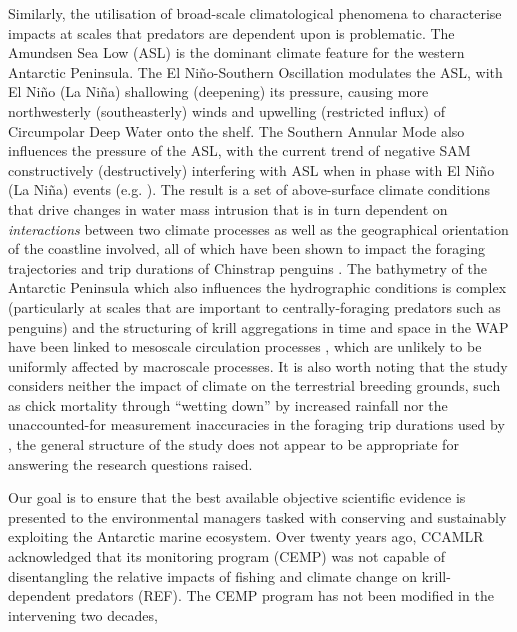 \documentclass[]{elsarticle} %
\begin{document}
Similarly, the utilisation of broad-scale climatological phenomena to
characterise impacts at scales that predators are dependent upon is
problematic. The Amundsen Sea Low (ASL) is the dominant climate feature
for the western Antarctic Peninsula. The El Niño-Southern Oscillation
modulates the ASL, with El Niño (La Niña) shallowing (deepening) its
pressure, causing more northwesterly (southeasterly) winds and upwelling
(restricted influx) of Circumpolar Deep Water onto the shelf. The
Southern Annular Mode also influences the pressure of the ASL, with the
current trend of negative SAM constructively (destructively) interfering
with ASL when in phase with El Niño (La Niña) events (e.g.
\citet{Clem2016}). The result is a set of above-surface climate
conditions that drive changes in water mass intrusion that is in turn
dependent on \emph{interactions} between two climate processes as well
as the geographical orientation of the coastline involved, all of which
have been shown to impact the foraging trajectories and trip durations
of Chinstrap penguins
\citep{LowtherA.D.TrathanP.TarrouxA.LydersenC.andKovacs2018}. The
bathymetry of the Antarctic Peninsula which also influences the
hydrographic conditions is complex (particularly at scales that are
important to centrally-foraging predators such as penguins) and the
structuring of krill aggregations in time and space in the WAP have been
linked to mesoscale circulation processes
\citep{santoraKrillSpaceComparative2012}, which are unlikely to be
uniformly affected by macroscale processes. It is also worth noting that
the study considers neither the impact of climate on the terrestrial
breeding grounds, such as chick mortality through ``wetting down'' by
increased rainfall \citep{chapmanMarineTerrestrialFactors2011} nor the
unaccounted-for measurement inaccuracies in the foraging trip durations
used by \citeauthor{Watters2020}
\citetext{\citeyear{Watters2020}; \citealp{Lowther2015}}, the general
structure of the study does not appear to be appropriate for answering
the research questions raised.

Our goal is to ensure that the best available objective scientific
evidence is presented to the environmental managers tasked with
conserving and sustainably exploiting the Antarctic marine ecosystem.
Over twenty years ago, CCAMLR acknowledged that its monitoring program
(CEMP) was not capable of disentangling the relative impacts of fishing
and climate change on krill-dependent predators (REF). The CEMP program
has not been modified in the intervening two decades, \newpage
\end{document}
